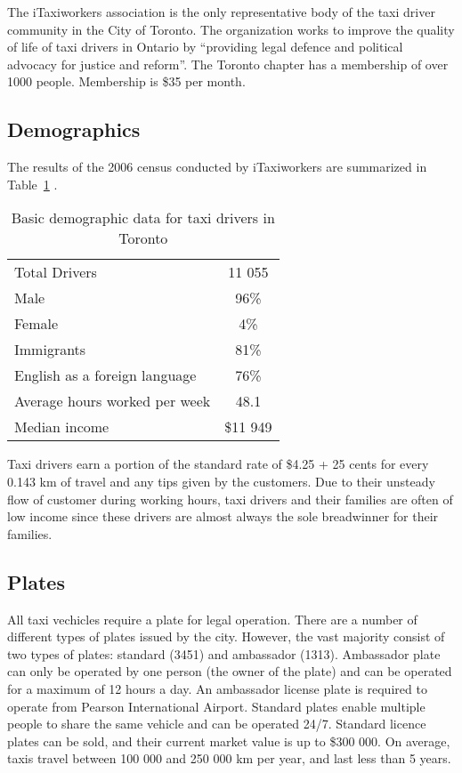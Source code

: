 \documentclass[11pt]{article}
\begin{document}
The iTaxiworkers association is the only representative body of the taxi driver community in the City of Toronto. 
The organization works to improve the quality of life of taxi drivers in Ontario by ``providing legal defence
and political advocacy for justice and reform''\cite{iTaxiWorkers2012}. The Toronto chapter
has a membership of over 1000 people. Membership is \$35 per month\cite{iTaxi2012, Abdiemail}.

\subsection{Demographics}
The results of the 2006 census conducted by iTaxiworkers are summarized in Table~\ref{tab:demographics} \cite{iTaxiWorkers2012}.
\begin{table}[h!]
\centering
\caption{Basic demographic data for taxi drivers in Toronto}
\label{tab:demographics}
\begin{tabular}{l c}
 Total Drivers & 11 055 \\
 Male & 96\% \\
 Female & 4\% \\
 Immigrants & 81\% \\
 English as a foreign language & 76\% \\
 Average hours worked per week & 48.1 \\
 Median income & \$11 949 \\
\end{tabular}
\end{table}

Taxi drivers earn a portion of the standard rate of \$4.25 + 25 cents for every 0.143 km of 
travel\cite{thestar2012} and any tips given by the customers. Due to their unsteady flow of 
customer during working hours, taxi drivers and their families are often of low income since these 
drivers are almost always the sole breadwinner for their families\cite{Abdiphone}.

\subsection{Plates}
All taxi vechicles require a plate for legal operation. There are a number of different types of plates issued by the city. However, the vast majority 
consist of two types of plates: standard (3451) and ambassador (1313)\cite{thestar2012}. 
Ambassador plate can only be operated by one person (the owner of the plate) and can be 
operated for a maximum of 12 hours a day. An ambassador license plate is required to 
operate from Pearson International Airport. Standard plates enable multiple people to share the same vehicle
and can be operated 24/7. Standard licence plates can be sold, and their
current market value is up to \$300 000\cite{thestar2012}. On average, taxis travel between 100 000 and 
250 000 km per year\cite{thestar2012}, and last less than 5 years\cite{thestar2012}. 
\end{document}
